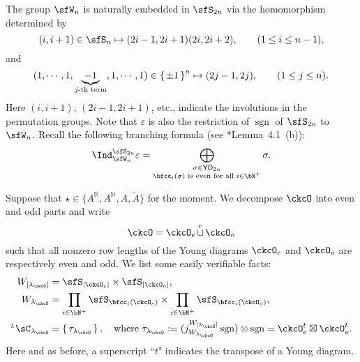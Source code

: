 \documentclass[12pt,a4paper]{amsart}
\def\abs#1{\left|{#1}\right|}
\newcommand{\BH}{{\mathbb {H}}}
\newcommand{\sgn}{\operatorname{sgn}}
\newcommand{\R}{\mathbb R}
\newcommand{\be}{\begin {equation}}
\newcommand{\ee}{\end {equation}}
\numberwithin{equation}{section}
\theoremstyle{remark}
\def\ckG{\check{G}}
\def\ckGc{\check{G}_{\bC}}
\def\YD{\mathsf{YD}}
\def\lamck{\lambda_\ckcO}
\def\LC{{}^{\scriptscriptstyle L}\sC}
\def\LRC{{}^{\scriptscriptstyle LR}\sC}
\def\AND{\quad \text{and} \quad}
\def\cuprow{{\stackrel{r}{\sqcup}}}
\def\cuprow{{\,\stackrel{r}{\sqcup}\,}}
\begin{document}
The group $\sfW_n$ is naturally embedded in $\sfS_{2n}$ via the homomorphism determined by
\be\label{wn1}
(i, i+1)\in \sfS_n\mapsto (2 i-1, 2i+1)(2i, 2i+2), \qquad (1\leq i\leq n-1),
\ee
and
       \be\label{wn2}
       (1,\cdots,1, \underbrace{-1}_{j\text{-th
        term}}, 1, \cdots, 1)\in \set{\pm 1}^n  \mapsto (2j-1, 2j), \qquad (1\leq j\leq n).
        \ee
Here $(i, i+1)$, $(2 i-1, 2i+1)$, etc., indicate the involutions in the permutation groups.  Note that $\varepsilon $ is also the restriction of $\sgn$ of $\sfS_{2n}$ to $\sfW_n$.
Recall the following branching formula (see \cite{BV.W}*{Lemma~4.1~(b)}):
\begin{equation}\label{IndFor}
  \Ind_{\sfW_{n}}^{\sfS_{2n}} \varepsilon = \bigoplus_{\substack{\sigma\in \YD_{2n}\\
      \bfcc_{i}(\sigma) \text{ is even for all }i\in \bN^+}} \sigma.
\end{equation}



Suppose that $\star\in  \{A^\R, A^\BH, A, \widetilde A\}$ for the moment. We decompose $\ckcO$ into even and odd parts and write %
\[
  \ckcO = \ckcO_{e} \cuprow \ckcO_{o}
\]
such that all nonzero row lengths of the Young diagrams $\ckcO_e$ and   $\ckcO_o$ are respectively even and odd.
We list
some easily verifiable facts:
\begin{equation}\label{eq:WA}
  \begin{split}
    W_{[\lamck]} & = \sfS_{\abs{\ckcO_{e}}}\times \sfS_{\abs{\ckcO_{o}}}, \\
    W_{\lamck} & = \prod_{i\in \bN^{+}}\sfS_{\bfcc_{i}(\ckcO_{e})}\times \prod_{i\in \bN^{+}}\sfS_{\bfcc_{i}(\ckcO_{o})},\\
    \LC_{\lamck} & = \set{\tau_{\lamck}}, \quad \textrm{where }  \tau_{\lamck} := (j_{W_{\lamck}}^{W_{[\lamck]}}\sgn )\otimes \sgn =  \ckcO_{e}^{t}\boxtimes \ckcO_{o}^{t}.
  \end{split}
\end{equation}
Here and as before, a superscript ``$t$" indicates the transpose of a Young diagram.
\end{document}
